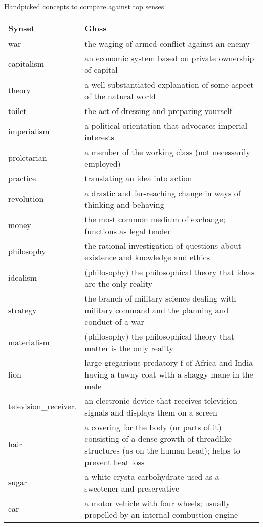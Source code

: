 Handpicked concepts to compare against top senses\\

\begin{tabular}{ p{2cm} p{5cm} }
    \toprule
    Synset & Gloss \\
    \midrule
            war & the waging of armed conflict against an enemy \\
            capitalism & an economic system based on private ownership of capital\\
            theory & a well-substantiated explanation of some aspect of the natural world \\
            toilet & the act of dressing and preparing yourself \\
            imperialism & a political orientation that advocates imperial interests \\
            proletarian & a member of the working class (not necessarily employed) \\
            practice & translating an idea into action \\
            revolution & a drastic and far-reaching change in ways of thinking and behaving \\
            money & the most common medium of exchange; functions as legal tender \\
            philosophy & the rational investigation of questions about existence and knowledge and ethics \\
            idealism & (philosophy) the philosophical theory that ideas are the only reality \\
            strategy & the branch of military science dealing with military command and the planning and conduct of a war \\
            materialism & (philosophy) the philosophical theory that matter is the only reality \\
            lion & large gregarious predatory f of Africa and India having a tawny coat with a shaggy mane in the male \\
            television\_receiver. & an electronic device that receives television signals and displays them on a screen \\
            hair & a covering for the body (or parts of it) consisting of a dense growth of threadlike structures (as on the human head); helps to prevent heat loss \\
            sugar & a white crysta carbohydrate used as a sweetener and preservative \\
            car & a motor vehicle with four wheels; usually propelled by an internal combustion engine \\

    \bottomrule
\end{tabular}
